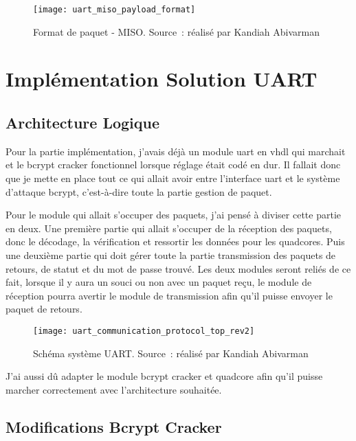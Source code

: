 \begin{figure}[tbph!]
	\centering
	\texttt{[image: uart\_miso\_payload\_format]}
	\caption[Format de paquet - MISO]{Format de paquet - MISO. Source : réalisé par Kandiah Abivarman}
	\label{fig:uart_miso_payload_format}
\end{figure}

\newpage

\section{Implémentation Solution UART}

\subsection{Architecture Logique}

Pour la partie implémentation, j’avais déjà un module \gls{uart} en \gls{vhdl} qui marchait et le bcrypt cracker fonctionnel lorsque réglage était codé en dur. 
Il fallait donc que je mette en place tout ce qui allait avoir entre l’interface \gls{uart} et le système d’attaque bcrypt, c’est-à-dire toute la partie gestion de paquet. 

Pour le module qui allait s’occuper des paquets, j’ai pensé à diviser cette partie en deux. 
Une première partie qui allait s’occuper de la réception des paquets, donc le décodage, la vérification et ressortir les données pour les quadcores. 
Puis une deuxième partie qui doit gérer toute la partie transmission des paquets de retours, de statut et du mot de passe trouvé. 
Les deux modules seront reliés de ce fait, lorsque il y aura un souci ou non avec un paquet reçu, le module de réception pourra avertir le module de transmission afin qu’il puisse envoyer le paquet de retours.

\begin{figure}[tbph!]
	\centering
	\texttt{[image: uart\_communication\_protocol\_top\_rev2]}
	\caption[Schéma système UART - FPGA]{Schéma système UART. Source : réalisé par Kandiah Abivarman}
	\label{fig:uart_top_schematics}
\end{figure}

J’ai aussi dû adapter le module bcrypt cracker et quadcore afin qu’il puisse marcher correctement avec l’architecture souhaitée.

\subsection{Modifications Bcrypt Cracker}

